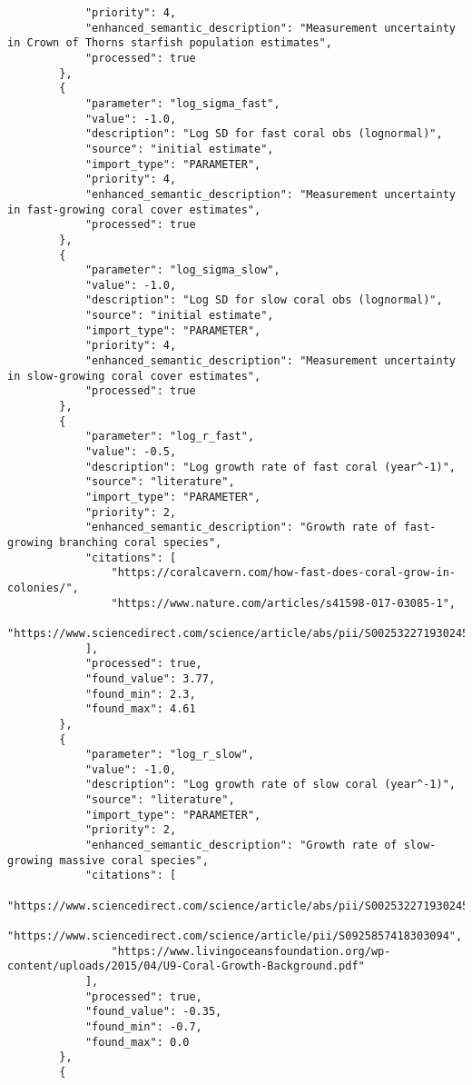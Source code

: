 \begin{lstlisting}
            "priority": 4,
            "enhanced_semantic_description": "Measurement uncertainty in Crown of Thorns starfish population estimates",
            "processed": true
        },
        {
            "parameter": "log_sigma_fast",
            "value": -1.0,
            "description": "Log SD for fast coral obs (lognormal)",
            "source": "initial estimate",
            "import_type": "PARAMETER",
            "priority": 4,
            "enhanced_semantic_description": "Measurement uncertainty in fast-growing coral cover estimates",
            "processed": true
        },
        {
            "parameter": "log_sigma_slow",
            "value": -1.0,
            "description": "Log SD for slow coral obs (lognormal)",
            "source": "initial estimate",
            "import_type": "PARAMETER",
            "priority": 4,
            "enhanced_semantic_description": "Measurement uncertainty in slow-growing coral cover estimates",
            "processed": true
        },
        {
            "parameter": "log_r_fast",
            "value": -0.5,
            "description": "Log growth rate of fast coral (year^-1)",
            "source": "literature",
            "import_type": "PARAMETER",
            "priority": 2,
            "enhanced_semantic_description": "Growth rate of fast-growing branching coral species",
            "citations": [
                "https://coralcavern.com/how-fast-does-coral-grow-in-colonies/",
                "https://www.nature.com/articles/s41598-017-03085-1",
                "https://www.sciencedirect.com/science/article/abs/pii/S0025322719302452"
            ],
            "processed": true,
            "found_value": 3.77,
            "found_min": 2.3,
            "found_max": 4.61
        },
        {
            "parameter": "log_r_slow",
            "value": -1.0,
            "description": "Log growth rate of slow coral (year^-1)",
            "source": "literature",
            "import_type": "PARAMETER",
            "priority": 2,
            "enhanced_semantic_description": "Growth rate of slow-growing massive coral species",
            "citations": [
                "https://www.sciencedirect.com/science/article/abs/pii/S0025322719302452",
                "https://www.sciencedirect.com/science/article/pii/S0925857418303094",
                "https://www.livingoceansfoundation.org/wp-content/uploads/2015/04/U9-Coral-Growth-Background.pdf"
            ],
            "processed": true,
            "found_value": -0.35,
            "found_min": -0.7,
            "found_max": 0.0
        },
        {

\end{lstlisting}
